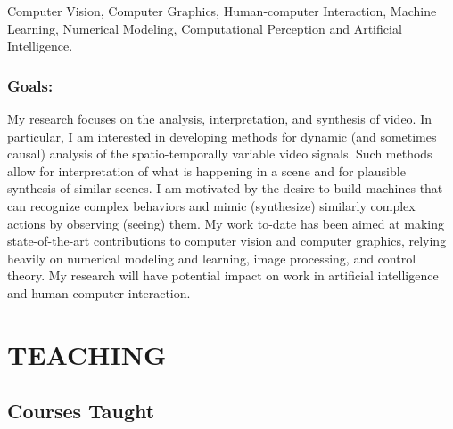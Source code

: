 Computer Vision, Computer Graphics, Human-computer Interaction,
Machine Learning, Numerical Modeling, Computational Perception and
Artificial Intelligence.


\subsubsection*{Goals:}

My research focuses on the analysis, interpretation, and synthesis
of video. In particular, I am interested in developing methods for
dynamic (and sometimes causal) analysis of the spatio-temporally
variable video signals. Such methods allow for interpretation of
what is happening in a scene and for plausible synthesis of
similar scenes. I am motivated by the desire to build machines
that can recognize complex behaviors and mimic (synthesize)
similarly complex actions by observing (seeing) them. My work
to-date has been aimed at making state-of-the-art contributions to
computer vision and computer graphics, relying heavily on
numerical modeling and learning, image processing, and control
theory. My research will have potential impact on work in
artificial intelligence and human-computer interaction.

%
%
%
%


\newpage
\section{TEACHING}
\label{sec:teaching}

\subsection{Courses Taught}
\label{subsec:courses}

